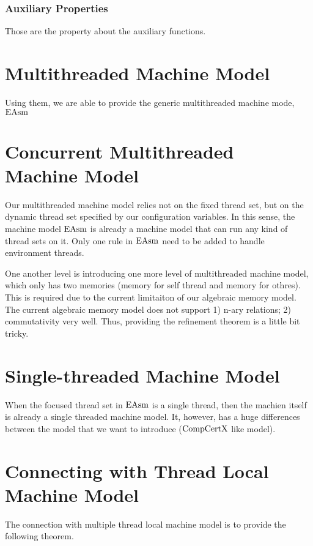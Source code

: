 \subsubsection{Auxiliary Properties}

Those are the property about the auxiliary functions. 

\section{Multithreaded Machine Model}
\label{chapter:linking:subsec:multithreaded-machine-model}

Using them, we are able to provide the generic multithreaded machine mode, $\mathrm{EAsm}$

\section{Concurrent Multithreaded Machine Model}
\label{chapter:linking:subsec:concurrent-multithreaded-machine-model}

Our multithreaded machine model relies not on the fixed thread set, but on 
the dynamic thread set specified by our configuration variables.
In this sense, the machine model $\mathrm{EAsm}$ is already a machine model that can run 
any kind of thread sets on it. 
Only one rule in $\mathrm{EAsm}$ need to be added to handle environment threads. 


One another level is introducing one more level of multithreaded machine model,
which only has two memories (memory for self thread and memory for othres).
This is required due to the current limitaiton of our algebraic memory model. 
The current algebraic memory model does not support 
1) n-ary relations; 2) commutativity very well. 
Thus, providing the refinement theorem is a little bit tricky. 


\section{Single-threaded Machine Model}
\label{chapter:linking:subsec:single-threaded-machine-model}
When the focused thread set in $\mathrm{EAsm}$ is a single thread, then the machien itself is 
already a single threaded machine model. 
It, however, has a huge differences between the model that we want to introduce ($\mathrm{CompCertX}$ like model).

\section{Connecting with Thread Local Machine Model}
\label{chapter:linking:subsec:connecting-with-thread-local-machine-model}

The connection with multiple thread local machine model is to provide the  following theorem. 
